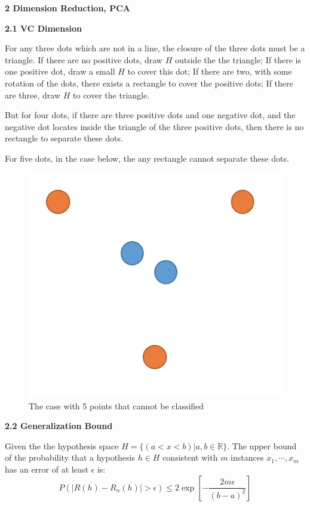 \documentclass[12pt]{article}
\begin{document}
\newpage
{\large \bf 2 Dimension Reduction, PCA}
\bigskip \par
{\bf 2.1 VC Dimension}
\bigskip \par
For any three dots which are not in a line, the closure of the three dots must be a triangle. If there are no positive dots, draw $H$ outside the the triangle; If there is one positive dot, draw a small $H$ to cover this dot; If there are two, with some rotation of the dots, there exists a rectangle to cover the positive dots; If there are three, draw $H$ to cover the triangle.
\par But for four dots, if there are three positive dots and one negative dot, and the negative dot locates inside the triangle of the three positive dots, then there is no rectangle to separate these dots.
\par For five dots, in the case below, the any rectangle cannot separate these dots.
\begin{figure}[ht]
\centering
\includegraphics[scale=0.56]{5.png}
\caption{The case with 5 points that cannot be classified}
\end{figure}
\bigskip \par
{\bf 2.2 Generalization Bound}
\bigskip \par
Given the the hypothesis space $H=\{(a<x<b)|a,b\in \mathbb{R}\}$. The upper bound of the probability that a hypothesis $h\in H$ consistent with $m$ instances $x_1,\cdots,x_m$ has an error of at least $\epsilon$ is:
$$P\left(\left|R(h)-R_n(h)\right|>\epsilon\right)\leq 2\exp\left[-\frac{2m\epsilon}{(b-a)^2}\right]$$ 
\end{document}
